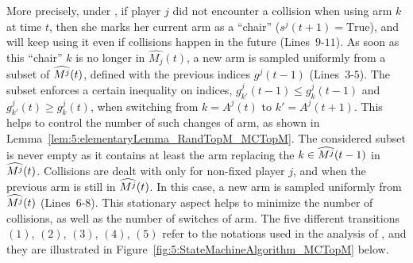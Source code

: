 

More precisely, under \MCTopM,
if player $j$ did not encounter a collision when using arm $k$ at time $t$,
then she marks her current arm as a ``chair'' ($s^j(t+1)=\mathrm{True}$),
and will keep using it even if collisions happen in the future (Lines~$9$-$11$).
%
As soon as this ``chair'' $k$ is no longer in $\widehat{M_j}(t)$,
a new arm is sampled uniformly from a subset of $\widehat{M^j}(t)$,
defined with the previous indices $g^j(t-1)$ (Lines~$3$-$5$).
%
The subset enforces a certain inequality on indices,
$g_{k'}^j(t-1) \leq g^j_{k}(t-1)$ and $g_{k'}^j(t) \geq g^j_{k}(t)$,
when switching from $k=A^j(t)$ to $k'=A^j(t+1)$.
This helps to control the number of such changes of arm,
as shown in Lemma~\ref{lem:5:elementaryLemma_RandTopM_MCTopM}.
The considered subset is never empty as it contains
at least the arm replacing the $k\in\widehat{M^j}(t-1)$ in $\widehat{M^j}(t)$.
Collisions are dealt with only for non-fixed player $j$,
and when the previous arm is still in $\widehat{M^j}(t)$.
%
In this case, a new arm is sampled uniformly from $\widehat{M^j}(t)$ (Lines~$6$-$8$).
%
%
This stationary aspect helps to minimize the number of collisions,
as well as the number of switches of arm.
%
The five different transitions $(1)$, $(2)$, $(3)$, $(4)$, $(5)$ refer to the notations used in the analysis of \MCTopM, and they are illustrated in Figure~\ref{fig:5:StateMachineAlgorithm_MCTopM} below.

